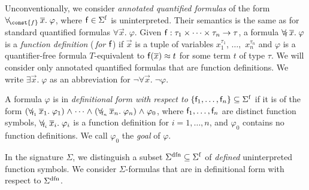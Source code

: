 Unconventionally,
we consider \emph{annotated quantified formulas} of the form
$\forallf{\const{f}} \vec x.\; \varphi$, where $\con{f} \in \sfuns{\Sigma}$ is
uninterpreted. Their
semantics is the same as for standard quantified formulas $\forall \vec x.\; \varphi$.
Given $\mathsf{f} : \tau_1 \times \cdots \times \tau_n \rightarrow \tau$,
a formula $\forall_{\!\mathsf{f}\:} \overline{x}.\; \varphi$ is a \emph{function definition}
(\,\emph{for $\mathsf{f}$}\vthinspace) if $\vec x$ is a tuple of variables
$x_1^{\tau_1}$, $\dotsc,$ $x_n^{\tau_n}$
and $\varphi$ is a quantifier-free formula
$T$-equivalent to $\mathsf{f}( \overline{x} ) \approx t$ for some term $t$ of type $\tau$.
We will consider only annotated quantified formulas that are function definitions.
We write $\exists
\vec x.\; \varphi$ as an abbreviation for $\neg \forall \vec x.\; \neg \varphi$.

\begin{definition}\rm
A formula $\varphi$ is in \emph{definitional form with respect to}
$\{ \con{f}_1, \dotsc, \con{f}_n \} \subseteq \sfuns{\Sigma}$ if it is of the
form
%
%
$(\forallf{\con{f}_1} \vec x_1.\; \varphi_1) \wedge \cdots \wedge
(\forallf{\con{f}_n} \vec x_n.\; \varphi_n) \wedge \varphi_0$,
%
where $\mathsf{f}_1, \dotsc, \mathsf{f}_n$ are distinct function symbols,
$\forall_{\!\mathsf{f}_i\:} \overline{x}_i.\; \varphi_i$ is a function definition
for $i = 1, \dotsc, n$,
%
and $\varphi_0$ contains no function definitions.
We call $\varphi_0$ the \emph{goal} of $\varphi$.
\end{definition}

In the signature $\Sigma$, we distinguish a subset $\sfundefs{\Sigma}
\subseteq \sfuns{\Sigma}$ of \emph{defined} uninterpreted function symbols.
We consider $\Sigma$-formulas that are in definitional form with respect to
$\sfundefs{\Sigma}$.

